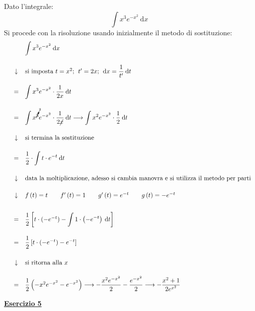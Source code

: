 \documentclass[a4paper]{article}
\newcommand{\example}[1]{\textcolor{Green4}{\textbf{#1}}}
\begin{document}
	\noindent
	Dato l'integrale:
	\begin{equation*}
		\displaystyle \int x^{3} e^{-x^{2}} \: \mathrm{d}x
	\end{equation*}
	Si procede con la risoluzione usando inizialmente il metodo di sostituzione:
	\begin{equation*}
		\begin{array}{rcl}
			&& \displaystyle \int x^{3} e^{-x^{2}} \: \mathrm{d}x \\ [2em]
			&\downarrow& \text{si imposta }t = x^{2}; \:\: t' = 2x; \:\: \mathrm{d}x = \dfrac{1}{t'}\:\mathrm{d}t \\ [1.5em]
			&=& \displaystyle \int x^{3} e^{-x^{2}} \cdot \dfrac{1}{2x} \: \mathrm{d}t \\ [2em]
			&=& \displaystyle \int x^{\cancelto{2}{3}} e^{-x^{2}} \cdot \dfrac{1}{2\cancel{x}} \: \mathrm{d}t \longrightarrow \displaystyle \int x^{2} e^{-x^{2}} \cdot \dfrac{1}{2} \: \mathrm{d}t \\ [2em]
			&\downarrow& \text{si termina la sostituzione} \\ [1.5em]
			&=& \displaystyle \dfrac{1}{2} \cdot \int t \cdot e^{-t} \: \mathrm{d}t \\ [2em]
			&\downarrow& \text{data la moltiplicazione, adesso si cambia manovra e si utilizza il metodo per parti} \\ [1.5em]
			&\downarrow& f\left(t\right) = t \hspace{2em} f'\left(t\right) = 1 \hspace{2em} g'\left(t\right) = e^{-t} \hspace{2em} g\left(t\right) = - e^{-t} \\ [2em]
			&=& \dfrac{1}{2}\left[t \cdot \left(-e^{-t}\right) - \displaystyle\int 1 \cdot \left(-e^{-t}\right) \: \mathrm{d}t \right] \\ [2em]
			&=& \dfrac{1}{2}\left[t \cdot \left(-e^{-t}\right) - e^{-t}\right] \\ [2em]
			&\downarrow& \text{si ritorna alla }x \\ [1.5em]
			&=& \dfrac{1}{2} \left(-x^{2}e^{-x^{2}} - e^{-x^{2}}\right)
			\longrightarrow
			-\dfrac{x^{2}e^{-x^{2}}}{2} - \dfrac{e^{-x^{2}}}{2}
			\longrightarrow
			-\dfrac{x^{2}+1}{2e^{x^{2}}}
		\end{array}
	\end{equation*}\newpage

	\begin{flushleft}
		\example{\underline{Esercizio 5}}
	\end{flushleft}
	
\end{document}
